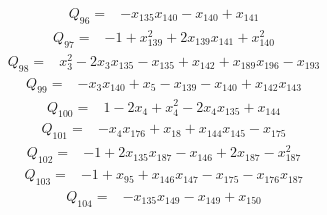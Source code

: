 \begin{equation*}\begin{aligned}
Q_{96}={}& -x_{135}x_{140}-x_{140}+x_{141}
\end{aligned}\end{equation*}
\begin{equation*}\begin{aligned}
Q_{97}={}& -1+x_{139}^{2}+2x_{139}x_{141}+x_{140}^{2}
\end{aligned}\end{equation*}
\begin{equation*}\begin{aligned}
Q_{98}={}& x_{3}^{2}-2x_{3}x_{135}-x_{135}+x_{142}+x_{189}x_{196}-x_{193}
\end{aligned}\end{equation*}
\begin{equation*}\begin{aligned}
Q_{99}={}& -x_{3}x_{140}+x_{5}-x_{139}-x_{140}+x_{142}x_{143}
\end{aligned}\end{equation*}
\begin{equation*}\begin{aligned}
Q_{100}={}& 1-2x_{4}+x_{4}^{2}-2x_{4}x_{135}+x_{144}
\end{aligned}\end{equation*}
\begin{equation*}\begin{aligned}
Q_{101}={}& -x_{4}x_{176}+x_{18}+x_{144}x_{145}-x_{175}
\end{aligned}\end{equation*}
\begin{equation*}\begin{aligned}
Q_{102}={}& -1+2x_{135}x_{187}-x_{146}+2x_{187}-x_{187}^{2}
\end{aligned}\end{equation*}
\begin{equation*}\begin{aligned}
Q_{103}={}& -1+x_{95}+x_{146}x_{147}-x_{175}-x_{176}x_{187}
\end{aligned}\end{equation*}
\begin{equation*}\begin{aligned}
Q_{104}={}& -x_{135}x_{149}-x_{149}+x_{150}
\end{aligned}\end{equation*}
